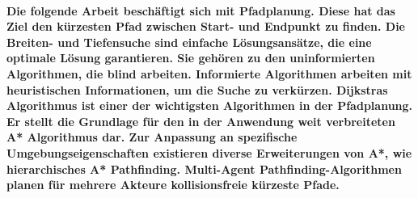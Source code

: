 \kurzfassung

\paragraph*{
Die folgende Arbeit beschäftigt sich mit Pfadplanung. Diese hat das Ziel den kürzesten Pfad zwischen Start- und Endpunkt zu finden. Die Breiten- und Tiefensuche sind einfache Lösungsansätze, die eine optimale Lösung garantieren. Sie gehören zu den uninformierten Algorithmen, die blind arbeiten. Informierte Algorithmen arbeiten mit heuristischen Informationen, um die Suche zu verkürzen. Dijkstras Algorithmus ist einer der wichtigsten Algorithmen in der Pfadplanung. Er stellt die Grundlage für den in der Anwendung weit verbreiteten A* Algorithmus dar. Zur Anpassung an spezifische Umgebungseigenschaften existieren diverse Erweiterungen von A*, wie hierarchisches A* Pathfinding. Multi-Agent Pathfinding-Algorithmen planen für mehrere Akteure kollisionsfreie kürzeste Pfade.
}
